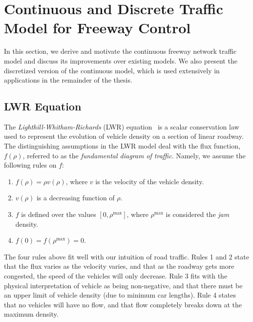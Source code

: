 \section{Continuous and Discrete Traffic Model for Freeway Control}
\label{sec:continous-and-discrete-traffic-model-for-ramp-metering}

In this section, we derive and motivate the continuous freeway network traffic model and discuss its improvements over existing models. We also present the discretized version of the continuous model, which is used extensively in applications in the remainder of the thesis. 

\subsection{LWR Equation}

The \emph{Lighthill-Whitham-Richards} (LWR) equation~\cite{lighthill1955kinematic,richards1956shock} is a scalar conservation law used to represent the evolution of vehicle density on a section of linear roadway. The distinguishing assumptions in the LWR model deal with the flux function, $f\left(\rho\right)$, referred to as the \emph{fundamental diagram of traffic}. Namely, we assume the following rules on $f$:

\begin{enumerate}
	\item $f\left(\rho \right) = \rho v\left(\rho \right)$, where $v$ is the velocity of the vehicle density.
	\item $v\left(\rho \right)$ is a decreasing function of $\rho$.
	\item $f$ is defined over the values $\left[0,\rho^{\max}\right]$, where $\rho^{\max}$ is considered the \emph{jam} density.
	\item $f\left(0\right) = f\left(\rho^{\max}\right) = 0$.
\end{enumerate}

The four rules above fit well with our intuition of road traffic. Rules 1 and 2 state that the flux varies as the velocity varies, and that as the roadway gets more congested, the speed of the vehicles will only decrease. Rule 3 fits with the physical interpretation of vehicle as being non-negative, and that there must be an upper limit of vehicle density (due to minimum car lengths). Rule 4 states that no vehicles will have no flow, and that flow completely breaks down at the maximum density.

